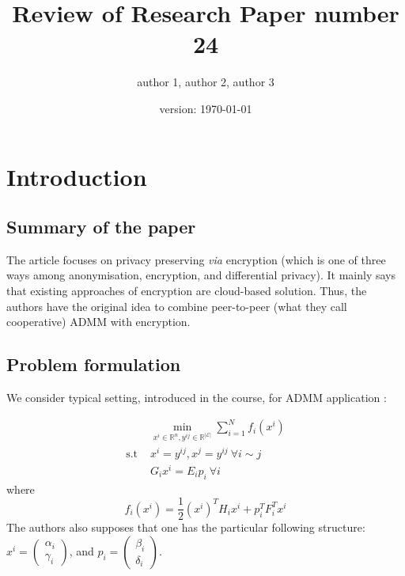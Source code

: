 \documentclass[10pt,english]{article}
\title{Review of Research Paper number 24}
\date{version: \today}%
\author{author 1, author 2, author 3}
\begin{document}
\maketitle

\section{Introduction}

\subsection{Summary of the paper}


The article focuses on privacy preserving \textit{via} encryption (which is one of three ways
among anonymisation, encryption, and differential privacy). It mainly says that existing approaches of encryption
are cloud-based solution. Thus, the authors have the original idea to combine peer-to-peer (what they call cooperative)
ADMM with encryption.

\subsection{Problem formulation}


We consider typical setting, introduced in the course, for ADMM application :

\begin{equation}
    \begin{aligned}
    &\min_{x^i\in\mathbb{R}^{n}, y^{ij}\in\mathbb{R}^{|\mathcal{E}|}} \sum_{i=1}^{N} f_i(x^i)\\
    \text{s.t } & x^i=y^{ij}, x^j=y^{ij}\  \forall i\sim j\\
    & G_i x^i = E_i p_i\ \forall i   
    \end{aligned}
\end{equation}
where 
\begin{equation}
f_i(x^i)=\dfrac{1}{2}(x^i)^T H_i x^i + p_i^T F_i^T x^i
\end{equation}
The authors also supposes that one has the particular following structure:
$x^i=\begin{pmatrix}
    \alpha_i\\
    \gamma_i
\end{pmatrix}$, and $p_i=\begin{pmatrix}
    \beta_i\\
    \delta_i
\end{pmatrix}$. 
\end{document}
